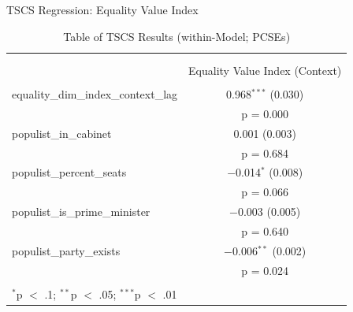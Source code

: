 \documentclass[
  ignorenonframetext,
]{beamer}
\begin{document}
\begin{frame}{TSCS Regression: Equality Value Index}
\protect\hypertarget{tscs-regression-equality-value-index}{}

\begin{table}[!htbp] \centering 
  \caption{Table of TSCS Results (within-Model; PCSEs)} 
  \label{} 
\scriptsize 
\begin{tabular}{@{\extracolsep{5pt}}lc} 
\\[-1.8ex]\hline \\[-1.8ex] 
\\[-1.8ex] & Equality Value Index (Context) \\ 
\hline \\[-1.8ex] 
 equality\_dim\_index\_context\_lag & 0.968$^{***}$ (0.030) \\ 
  & p = 0.000 \\ 
  populist\_in\_cabinet & 0.001 (0.003) \\ 
  & p = 0.684 \\ 
  populist\_percent\_seats & $-$0.014$^{*}$ (0.008) \\ 
  & p = 0.066 \\ 
  populist\_is\_prime\_minister & $-$0.003 (0.005) \\ 
  & p = 0.640 \\ 
  populist\_party\_exists & $-$0.006$^{**}$ (0.002) \\ 
  & p = 0.024 \\ 
 \hline \\[-1.8ex] 
\multicolumn{2}{l}{$^{*}$p $<$ .1; $^{**}$p $<$ .05; $^{***}$p $<$ .01} \\ 
\end{tabular} 
\end{table}

\end{frame}
\end{document}
